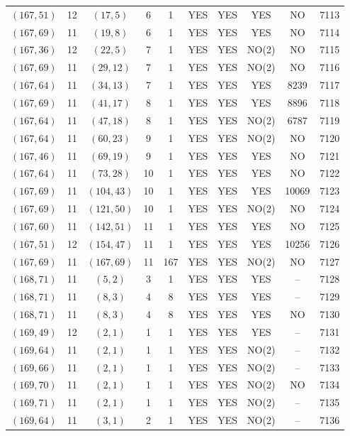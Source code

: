 \begin{longtable}{|c|c|c|c|c|c|c|c|c|c|}
$(167, 51)$ & 12 & $(17, 5)$ & 6 & 1 & YES & YES & YES & NO & 7113\\
$(167, 69)$ & 11 & $(19, 8)$ & 6 & 1 & YES & YES & YES & NO & 7114\\
$(167, 36)$ & 12 & $(22, 5)$ & 7 & 1 & YES & YES & NO(2) & NO & 7115\\
$(167, 69)$ & 11 & $(29, 12)$ & 7 & 1 & YES & YES & NO(2) & NO & 7116\\
$(167, 64)$ & 11 & $(34, 13)$ & 7 & 1 & YES & YES & YES & 8239 & 7117\\
$(167, 69)$ & 11 & $(41, 17)$ & 8 & 1 & YES & YES & YES & 8896 & 7118\\
$(167, 64)$ & 11 & $(47, 18)$ & 8 & 1 & YES & YES & NO(2) & 6787 & 7119\\
$(167, 64)$ & 11 & $(60, 23)$ & 9 & 1 & YES & YES & NO(2) & NO & 7120\\
$(167, 46)$ & 11 & $(69, 19)$ & 9 & 1 & YES & YES & YES & NO & 7121\\
$(167, 64)$ & 11 & $(73, 28)$ & 10 & 1 & YES & YES & YES & NO & 7122\\
$(167, 69)$ & 11 & $(104, 43)$ & 10 & 1 & YES & YES & YES & 10069 & 7123\\
$(167, 69)$ & 11 & $(121, 50)$ & 10 & 1 & YES & YES & NO(2) & NO & 7124\\
$(167, 60)$ & 11 & $(142, 51)$ & 11 & 1 & YES & YES & YES & NO & 7125\\
$(167, 51)$ & 12 & $(154, 47)$ & 11 & 1 & YES & YES & YES & 10256 & 7126\\
$(167, 69)$ & 11 & $(167, 69)$ & 11 & 167 & YES & YES & NO(2) & NO & 7127\\
$(168, 71)$ & 11 & $(5, 2)$ & 3 & 1 & YES & YES & YES & -- & 7128\\
$(168, 71)$ & 11 & $(8, 3)$ & 4 & 8 & YES & YES & YES & -- & 7129\\
$(168, 71)$ & 11 & $(8, 3)$ & 4 & 8 & YES & YES & YES & NO & 7130\\
$(169, 49)$ & 12 & $(2, 1)$ & 1 & 1 & YES & YES & YES & -- & 7131\\
$(169, 64)$ & 11 & $(2, 1)$ & 1 & 1 & YES & YES & NO(2) & -- & 7132\\
$(169, 66)$ & 11 & $(2, 1)$ & 1 & 1 & YES & YES & NO(2) & -- & 7133\\
$(169, 70)$ & 11 & $(2, 1)$ & 1 & 1 & YES & YES & NO(2) & NO & 7134\\
$(169, 71)$ & 11 & $(2, 1)$ & 1 & 1 & YES & YES & NO(2) & -- & 7135\\
$(169, 64)$ & 11 & $(3, 1)$ & 2 & 1 & YES & YES & NO(2) & -- & 7136\\

\end{longtable}
